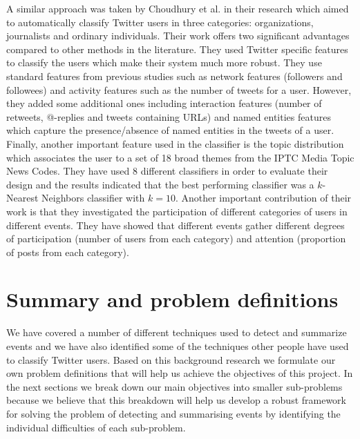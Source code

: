 A similar approach was taken by Choudhury et al. \cite{Choudhury} in their research which aimed to automatically classify Twitter users in three categories: organizations, journalists and ordinary individuals. Their work offers two significant advantages compared to other methods in the literature. They used Twitter specific features to classify the users which make their system much more robust. They use standard features from previous studies such as network features (followers and followees) and activity features such as the number of tweets for a user. However, they added some additional ones including interaction features (number of retweets, @-replies and tweets containing URLs) and named entities features which capture the presence/absence of named entities in the tweets of a user. Finally, another important feature used in the classifier is the topic distribution which associates the user to a set of 18 broad themes from the IPTC Media Topic News Codes. They have used 8 different classifiers in order to evaluate their design and the results indicated that the best performing classifier was a $k$-Nearest Neighbors classifier with $k = 10$. Another important contribution of their work is that they investigated the participation of different categories of users in different events. They have showed that different events gather different degrees of participation (number of users from each category) and attention (proportion of posts from each category). 

\section{Summary and problem definitions}
We have covered a number of different techniques used to detect and summarize events and we have also identified some of the techniques other people have used to classify Twitter users. Based on this background research we formulate our own problem definitions that will help us achieve the objectives of this project. In the next sections we break down our main objectives into smaller sub-problems because we believe that this breakdown will help us develop a robust framework for solving the problem of detecting and summarising events by identifying the individual difficulties of each sub-problem.  	

